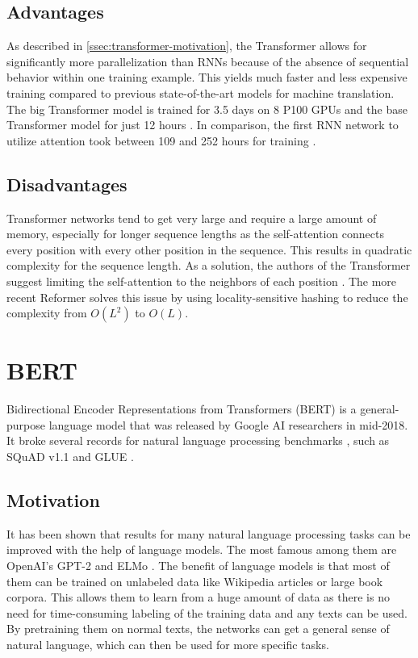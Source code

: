 \subsection{Advantages}

As described in \cref{ssec:transformer-motivation}, the Transformer allows for significantly more parallelization than RNNs because of the absence of sequential behavior within one training example.
This yields much faster and less expensive training compared to previous state-of-the-art models for machine translation.
The big Transformer model is trained for 3.5 days on 8 P100 GPUs and the base Transformer model for just 12 hours \cite[p.~7]{1706.03762}. 
In comparison, the first RNN network to utilize attention took between 109 and 252 hours for training \cite[p.~14]{1409.0473}.

\subsection{Disadvantages}

Transformer networks tend to get very large and require a large amount of memory, especially for longer sequence lengths as the self-attention connects every position with every other position in the sequence.
This results in quadratic complexity for the sequence length.
As a solution, the authors of the Transformer suggest limiting the self-attention to the neighbors of each position \cite[p.~6--7]{1706.03762}.  
The more recent Reformer \cite{kitaev2020reformer} solves this issue by using locality-sensitive hashing to reduce the complexity from $O(L^2)$ to $O(L)$.


\section{BERT}\label{sec:bert}

Bidirectional Encoder Representations from Transformers (BERT) is a general-purpose language model that was released by Google AI researchers in mid-2018.
It broke several records for natural language processing benchmarks \cite[p.~5--7]{devlin2018bert}, such as  SQuAD v1.1 \cite{rajpurkar-etal-2016-squad} and GLUE \cite{1804.07461}.

\subsection{Motivation}

It has been shown that results for many natural language processing tasks can be improved with the help of language models.
The most famous among them are OpenAI's GPT-2 \cite{radford2019language} and ELMo \cite{1802.05365}.
The benefit of language models is that most of them can be trained on unlabeled data like Wikipedia articles or large book corpora.
This allows them to learn from a huge amount of data as there is no need for time-consuming labeling of the training data and any texts can be used.
By pretraining them on normal texts, the networks can get a general sense of natural language, which can then be used for more specific tasks.

